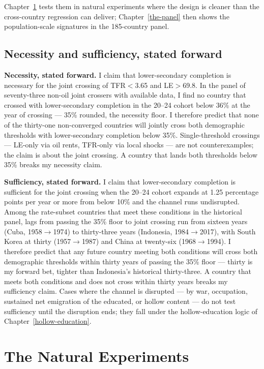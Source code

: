 \documentclass[12pt,letterpaper]{article}
\begin{document}
Chapter~\ref{natural-experiments} tests them in natural experiments where the design is cleaner than the cross-country regression can deliver; Chapter~\ref{the-panel} then shows the population-scale signatures in the 185-country panel.

\subsection{Necessity and sufficiency, stated forward}\label{necessity-sufficiency-forward}

\textbf{Necessity, stated forward.} I claim that lower-secondary completion is necessary for the joint crossing of TFR$<$3.65 and LE$>$69.8. In the panel of seventy-three non-oil joint crossers with available data, I find no country that crossed with lower-secondary completion in the 20--24 cohort below 36\% at the year of crossing --- 35\% rounded, the necessity floor. I therefore predict that none of the thirty-one non-converged countries will jointly cross both demographic thresholds with lower-secondary completion below 35\%. Single-threshold crossings --- LE-only via oil rents, TFR-only via local shocks --- are not counterexamples; the claim is about the joint crossing. A country that lands both thresholds below 35\% breaks my necessity claim.

\textbf{Sufficiency, stated forward.} I claim that lower-secondary completion is sufficient for the joint crossing when the 20--24 cohort expands at 1.25 percentage points per year or more from below 10\% and the channel runs undisrupted. Among the rate-subset countries that meet these conditions in the historical panel, lags from passing the 35\% floor to joint crossing run from sixteen years (Cuba, 1958$\to$1974) to thirty-three years (Indonesia, 1984$\to$2017), with South Korea at thirty (1957$\to$1987) and China at twenty-six (1968$\to$1994). I therefore predict that any future country meeting both conditions will cross both demographic thresholds within thirty years of passing the 35\% floor --- thirty is my forward bet, tighter than Indonesia's historical thirty-three. A country that meets both conditions and does not cross within thirty years breaks my sufficiency claim. Cases where the channel is disrupted --- by war, occupation, sustained net emigration of the educated, or hollow content --- do not test sufficiency until the disruption ends; they fall under the hollow-education logic of Chapter~\ref{hollow-education}.


\section{The Natural Experiments}\label{natural-experiments}
\end{document}
